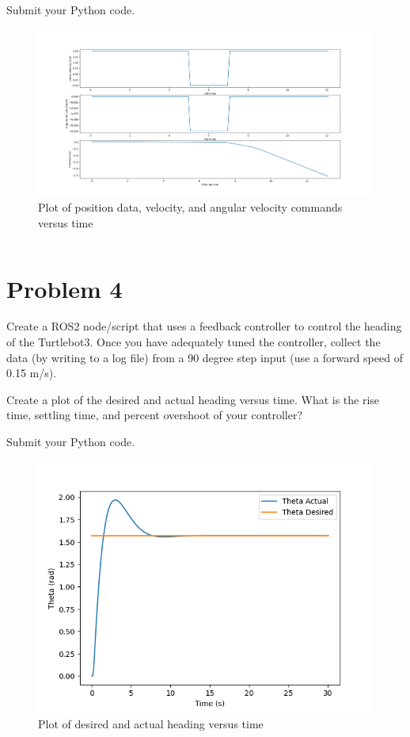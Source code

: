 \documentclass{article}
\begin{document}
\bigskip
\noindent Submit your Python code.

\begin{figure}[H]
    \centering
    \includegraphics[width=\textwidth]{question3.png}
    \caption*{Plot of position data, velocity, and angular velocity commands versus time}
\end{figure}

\begin{verbatim}
\end{verbatim}

\section*{Problem 4}
Create a ROS2 node/script that uses a feedback controller to control the heading of the Turtlebot3. 
Once you have adequately tuned the controller, collect the data (by writing to a log file) from a 90 
degree step input (use a forward speed of 0.15 m/s).

\bigskip
\noindent Create a plot of the desired and actual heading versus time. What is the rise time, settling time, and 
percent overshoot of your controller? 

\bigskip
\noindent Submit your Python code.

\begin{figure}[H]
    \centering
    \includegraphics[width=\textwidth]{question4.png}
    \caption*{Plot of desired and actual heading versus time}
\end{figure}
\end{document}

